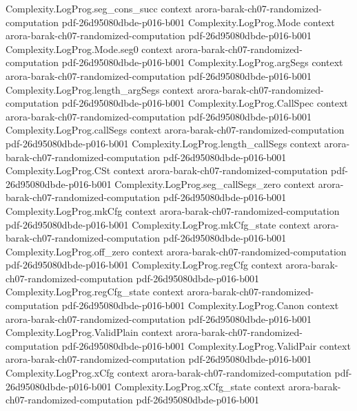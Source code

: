 \begin{theorem}
\proofstep
  {Complexity.LogProg.seg_cons_succ}
  {context}
  {arora-barak-ch07-randomized-computation}
  {pdf-26d95080dbde-p016-b001}
\proofstep
  {Complexity.LogProg.Mode}
  {context}
  {arora-barak-ch07-randomized-computation}
  {pdf-26d95080dbde-p016-b001}
\proofstep
  {Complexity.LogProg.Mode.seg0}
  {context}
  {arora-barak-ch07-randomized-computation}
  {pdf-26d95080dbde-p016-b001}
\proofstep
  {Complexity.LogProg.argSegs}
  {context}
  {arora-barak-ch07-randomized-computation}
  {pdf-26d95080dbde-p016-b001}
\proofstep
  {Complexity.LogProg.length_argSegs}
  {context}
  {arora-barak-ch07-randomized-computation}
  {pdf-26d95080dbde-p016-b001}
\proofstep
  {Complexity.LogProg.CallSpec}
  {context}
  {arora-barak-ch07-randomized-computation}
  {pdf-26d95080dbde-p016-b001}
\proofstep
  {Complexity.LogProg.callSegs}
  {context}
  {arora-barak-ch07-randomized-computation}
  {pdf-26d95080dbde-p016-b001}
\proofstep
  {Complexity.LogProg.length_callSegs}
  {context}
  {arora-barak-ch07-randomized-computation}
  {pdf-26d95080dbde-p016-b001}
\proofstep
  {Complexity.LogProg.CSt}
  {context}
  {arora-barak-ch07-randomized-computation}
  {pdf-26d95080dbde-p016-b001}
\proofstep
  {Complexity.LogProg.seg_callSegs_zero}
  {context}
  {arora-barak-ch07-randomized-computation}
  {pdf-26d95080dbde-p016-b001}
\proofstep
  {Complexity.LogProg.mkCfg}
  {context}
  {arora-barak-ch07-randomized-computation}
  {pdf-26d95080dbde-p016-b001}
\proofstep
  {Complexity.LogProg.mkCfg_state}
  {context}
  {arora-barak-ch07-randomized-computation}
  {pdf-26d95080dbde-p016-b001}
\proofstep
  {Complexity.LogProg.off_zero}
  {context}
  {arora-barak-ch07-randomized-computation}
  {pdf-26d95080dbde-p016-b001}
\proofstep
  {Complexity.LogProg.regCfg}
  {context}
  {arora-barak-ch07-randomized-computation}
  {pdf-26d95080dbde-p016-b001}
\proofstep
  {Complexity.LogProg.regCfg_state}
  {context}
  {arora-barak-ch07-randomized-computation}
  {pdf-26d95080dbde-p016-b001}
\proofstep
  {Complexity.LogProg.Canon}
  {context}
  {arora-barak-ch07-randomized-computation}
  {pdf-26d95080dbde-p016-b001}
\proofstep
  {Complexity.LogProg.ValidPlain}
  {context}
  {arora-barak-ch07-randomized-computation}
  {pdf-26d95080dbde-p016-b001}
\proofstep
  {Complexity.LogProg.ValidPair}
  {context}
  {arora-barak-ch07-randomized-computation}
  {pdf-26d95080dbde-p016-b001}
\proofstep
  {Complexity.LogProg.xCfg}
  {context}
  {arora-barak-ch07-randomized-computation}
  {pdf-26d95080dbde-p016-b001}
\proofstep
  {Complexity.LogProg.xCfg_state}
  {context}
  {arora-barak-ch07-randomized-computation}
  {pdf-26d95080dbde-p016-b001}

\end{theorem}
